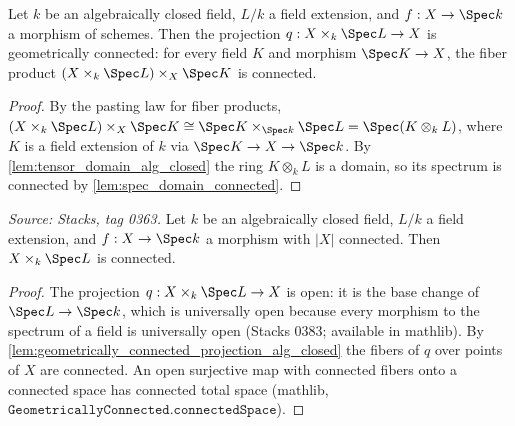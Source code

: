 \begin{lemma}\leanok
  \label{lem:geometrically_connected_projection_alg_closed}
  Let \(k\) be an algebraically closed field, \(L/k\) a field extension,
  and \(f : X \to \Spec k\) a morphism of schemes. Then the projection
  \(q : X \times_k \Spec L \to X\) is geometrically connected: for every
  field \(K\) and morphism \(\Spec K \to X\), the fiber product
  \((X \times_k \Spec L) \times_X \Spec K\) is connected.
\end{lemma}
\begin{proof}
  \leanok
  By the pasting law for fiber products,
  \((X \times_k \Spec L) \times_X \Spec K \cong \Spec K \times_{\Spec k}
  \Spec L = \Spec (K \otimes_k L)\), where \(K\) is a field extension of
  \(k\) via \(\Spec K \to X \to \Spec k\). By
  \cref{lem:tensor_domain_alg_closed} the ring \(K \otimes_k L\) is a
  domain, so its spectrum is connected by
  \cref{lem:spec_domain_connected}.
\end{proof}

\begin{lemma}\leanok
  \label{lem:connected_base_change_alg_closed}
  \textit{Source: Stacks, tag 0363.}
  Let \(k\) be an algebraically closed field, \(L/k\) a field extension,
  and \(f : X \to \Spec k\) a morphism with \(|X|\) connected. Then
  \(X \times_k \Spec L\) is connected.
\end{lemma}
\begin{proof}
  \leanok
  The projection \(q : X \times_k \Spec L \to X\) is open: it is the
  base change of \(\Spec L \to \Spec k\), which is universally open
  because every morphism to the spectrum of a field is universally open
  (Stacks 0383; available in mathlib). By
  \cref{lem:geometrically_connected_projection_alg_closed} the
  fibers of \(q\) over points of \(X\) are connected. An open
  surjective map with connected fibers onto a connected space has
  connected total space (mathlib,
  \(\texttt{GeometricallyConnected.connectedSpace}\)).
\end{proof}

